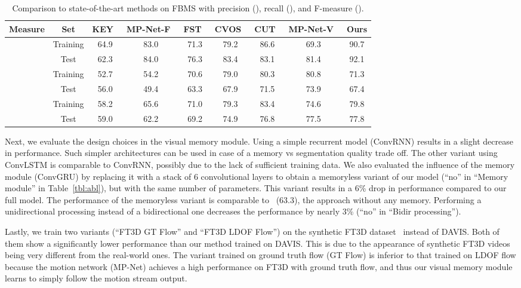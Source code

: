 \documentclass[10pt,twocolumn,letterpaper]{article}
\begin{document}
\begin{table*}[t]
\begin{center}
\begin{tabular}{c|c|c c c c c c c }
\hline
Measure & Set & KEY~\cite{lee2011key} & MP-Net-F~\cite{tokmakov2016learning} & FST~\cite{papazoglou2013fast} & CVOS~\cite{taylor2015causal} & CUT~\cite{keuper2015motion} & MP-Net-V~\cite{tokmakov2016learning} & Ours \\
\hline
\multirow{2}{*}{} & Training & 64.9 & 83.0 & 71.3 & 79.2 & 86.6 & 69.3 & 90.7 \\
& Test & 62.3 & 84.0 & 76.3 & 83.4 & 83.1 & 81.4 & 92.1 \\
\hline
\multirow{2}{*}{} & Training & 52.7 & 54.2 & 70.6 & 79.0 & 80.3 & 80.8 & 71.3 \\
 & Test & 56.0 & 49.4 & 63.3 & 67.9 & 71.5 & 73.9 & 67.4 \\
\hline
\multirow{2}{*}{} & Training & 58.2 & 65.6 & 71.0 & 79.3 & 83.4 & 74.6 & 79.8 \\
 & Test & 59.0 & 62.2 & 69.2 & 74.9 & 76.8 & 77.5 & 77.8 \\
\hline
\end{tabular}
\vspace{0.1cm}
\caption{Comparison to state-of-the-art methods on FBMS with precision (), recall (), and F-measure ().}
\label{tbl:bms}
\vspace{-0.5cm}
\end{center}
\end{table*}

Next, we evaluate the design choices in the visual memory module. Using a
simple recurrent model (ConvRNN) results in a slight decrease in performance.
Such simpler architectures can be used in case of a memory vs segmentation
quality trade off. The other variant using ConvLSTM is comparable to ConvRNN,
possibly due to the lack of sufficient training data. We also evaluated the
influence of the memory module (ConvGRU) by replacing it with a stack of 6
convolutional layers to obtain a memoryless variant of our model (``no'' in
``Memory module'' in Table~\ref{tbl:abl}), but with the same number of
parameters. This variant results in a 6\% drop in performance compared to our
full model. The performance of the memoryless variant is comparable
to~\cite{tokmakov2016learning} (63.3), the approach without any memory.
Performing a unidirectional processing instead of a bidirectional one decreases
the performance by nearly 3\% (``no'' in ``Bidir processing'').

Lastly, we train two variants (``FT3D GT Flow'' and ``FT3D LDOF Flow'') on the
synthetic FT3D dataset~\cite{Mayer16} instead of DAVIS. Both of them show a
significantly lower performance than our method trained on DAVIS. This is due
to the appearance of synthetic FT3D videos being very different from the
real-world ones. The variant trained on ground truth flow (GT Flow) is inferior
to that trained on LDOF flow because the motion network (MP-Net) achieves a
high performance on FT3D with ground truth flow, and thus our visual memory
module learns to simply follow the motion stream output.
\end{document}
